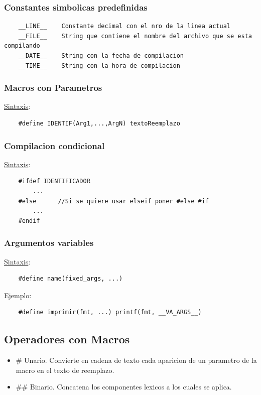 \documentclass{article}
\begin{document}
\subsubsection*{Constantes simbolicas predefinidas}
\begin{lstlisting}
    __LINE__    Constante decimal con el nro de la linea actual
    __FILE__    String que contiene el nombre del archivo que se esta compilando
    __DATE__    String con la fecha de compilacion
    __TIME__    String con la hora de compilacion
            \end{lstlisting}
\subsubsection*{Macros con Parametros}
\underline{Sintaxis}:
\begin{lstlisting}
    #define IDENTIF(Arg1,...,ArgN) textoReemplazo
\end{lstlisting}
\subsubsection*{Compilacion condicional}
\underline{Sintaxis}:
\begin{lstlisting}
    #ifdef IDENTIFICADOR
        ...
    #else      //Si se quiere usar elseif poner #else #if
        ...
    #endif
\end{lstlisting}
\subsubsection*{Argumentos variables}
\underline{Sintaxis}:
\begin{lstlisting}
    #define name(fixed_args, ...)
\end{lstlisting}
Ejemplo:
\begin{lstlisting}
    #define imprimir(fmt, ...) printf(fmt, __VA_ARGS__)
\end{lstlisting}

\subsection{Operadores con Macros}
\begin{itemize}
    \item \# Unario. Convierte en cadena de texto cada aparicion de un parametro de la macro en el texto de reemplazo.
    \item \#\# Binario. Concatena los componentes lexicos a los cuales se aplica.
\end{itemize}
\end{document}
